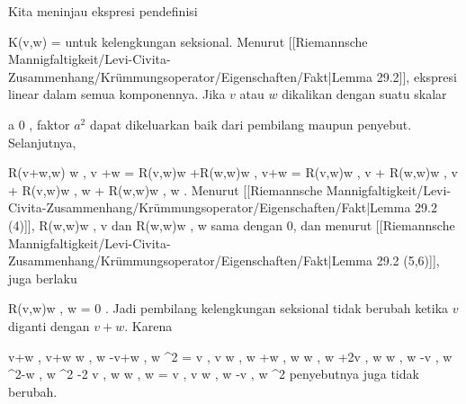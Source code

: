 {

Kita meninjau ekspresi pendefinisi

\mavergleichskettedisp
{\vergleichskette
{ K(v,w)
}
{ =} { {  }
}
{ } {
}
{ } {
}
{ } {
}
}
{}{}{}
untuk kelengkungan seksional. Menurut
[[Riemannsche Mannigfaltigkeit/Levi-Civita-Zusammenhang/Krümmungsoperator/Eigenschaften/Fakt|Lemma 29.2]],
ekspresi
 linear dalam semua komponennya. Jika $v$ atau $w$ dikalikan dengan suatu skalar

\mavergleichskette
{\vergleichskette
{ a
}
{ \neq }{ 0
}
{  }{
}
{    }{
}
{   }{
}
}
{}{}{,}
faktor $a^2$ dapat dikeluarkan baik dari pembilang maupun penyebut. Selanjutnya,

\mavergleichskettealignhandlinks
{\vergleichskettealignhandlinks
{ \left\langle  R(v+w,w) w  , v +w   \right\rangle
}
{ =} { \left\langle  R(v,w)w +R(w,w)w  , v+w   \right\rangle
}
{ =} { \left\langle  R(v,w)w   , v   \right\rangle  +  \left\langle  R(w,w)w  ,  v   \right\rangle + \left\langle  R(v,w)w  ,  w   \right\rangle  +  \left\langle  R(w,w)w   , w   \right\rangle
}
{ } {
}
{ } {
}
}
{}
{}{.}
Menurut
[[Riemannsche Mannigfaltigkeit/Levi-Civita-Zusammenhang/Krümmungsoperator/Eigenschaften/Fakt|Lemma 29.2 (4)]],
\mathkor {} {\left\langle  R(w,w)w  ,  v   \right\rangle} {dan} {\left\langle  R(w,w)w   , w   \right\rangle} {}
sama dengan $0$, dan menurut
[[Riemannsche Mannigfaltigkeit/Levi-Civita-Zusammenhang/Krümmungsoperator/Eigenschaften/Fakt|Lemma 29.2 (5,6)]],
juga berlaku

\mavergleichskette
{\vergleichskette
{ \left\langle  R(v,w)w  ,  w   \right\rangle
}
{ = }{ 0
}
{  }{
}
{    }{
}
{   }{
}
}
{}{}{.}
Jadi pembilang kelengkungan seksional tidak berubah ketika $v$ diganti dengan $v+w$. Karena

\mavergleichskettealigndrucklinks
{\vergleichskettealigndrucklinks
{ \left\langle v+w , v+w  \right\rangle \left\langle  w  , w  \right\rangle -\left\langle v+w , w  \right\rangle^2
}
{ =} { \left\langle  v  , v  \right\rangle  \left\langle  w  , w  \right\rangle+\left\langle  w  , w  \right\rangle \left\langle  w  , w  \right\rangle +2\left\langle  v  , w  \right\rangle \left\langle  w  , w  \right\rangle -\left\langle v  , w  \right\rangle^2-\left\langle w  , w  \right\rangle^2 -2 \left\langle v  , w  \right\rangle \left\langle w  , w  \right\rangle
}
{ =} { \left\langle  v  , v  \right\rangle \left\langle  w  , w  \right\rangle -\left\langle v  , w  \right\rangle^2
}
{ } {
}
{ } {
}
}
{}{}{}
penyebutnya juga tidak berubah.

}

